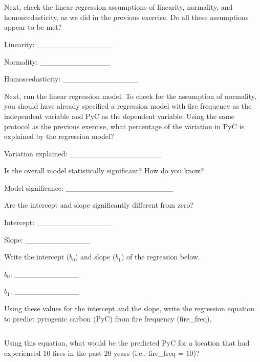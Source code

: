 \documentclass[
]{scrbook}
\begin{document}
\begin{verbatim}








\end{verbatim}

Next, check the linear regression assumptions of linearity, normality, and homoscedasticity, as we did in the previous exercise.
Do all these assumptions appear to be met?

Linearity: \_\_\_\_\_\_\_\_\_\_\_\_\_\_

Normality: \_\_\_\_\_\_\_\_\_\_\_\_\_

Homoscedasticity: \_\_\_\_\_\_\_\_\_\_\_\_\_\_

Next, run the linear regression model.
To check for the assumption of normality, you should have already specified a regression model with fire frequency as the independent variable and PyC as the dependent variable.
Using the same protocol as the previous exercise, what percentage of the variation in PyC is explained by the regression model?

Variation explained: \_\_\_\_\_\_\_\_\_\_\_\_\_\_\_\_\_

Is the overall model statistically significant?
How do you know?

Model significance: \_\_\_\_\_\_\_\_\_\_\_\_\_\_\_\_\_\_\_\_

Are the intercept and slope significantly different from zero?

Intercept: \_\_\_\_\_\_\_\_\_\_\_\_\_\_

Slope: \_\_\_\_\_\_\_\_\_\_\_\_

Write the intercept (\(b_{0}\)) and slope (\(b_{1}\)) of the regression below.

\(b_{0}\): \_\_\_\_\_\_\_\_\_\_\_\_

\(b_{1}\): \_\_\_\_\_\_\_\_\_\_\_\_

Using these values for the intercept and the slope, write the regression equation to predict pyrogenic carbon (PyC) from fire frequency (fire\_freq).

\begin{verbatim}

\end{verbatim}

Using this equation, what would be the predicted PyC for a location that had experienced 10 fires in the past 20 years (i.e., fire\_freq = 10)?

\begin{verbatim}

\end{verbatim}
\end{document}
